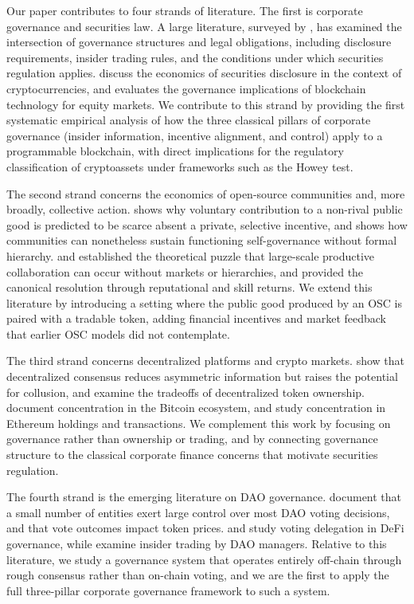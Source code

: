 \documentclass[No]{AEA}
\begin{document}
Our paper contributes to four strands of literature. The first is corporate governance and securities law. A large literature, surveyed by \cite{Mahoney2009}, has examined the intersection of governance structures and legal obligations, including disclosure requirements, insider trading rules, and the conditions under which securities regulation applies. \cite{Choi_Pritchard2019} discuss the economics of securities disclosure in the context of cryptocurrencies, and \cite{yermack2017corporate} evaluates the governance implications of blockchain technology for equity markets. We contribute to this strand by providing the first systematic empirical analysis of how the three classical pillars of corporate governance (insider information, incentive alignment, and control) apply to a programmable blockchain, with direct implications for the regulatory classification of cryptoassets under frameworks such as the Howey test.

The second strand concerns the economics of open-source communities and, more broadly, collective action. \cite{Olson1965} shows why voluntary contribution to a non-rival public good is predicted to be scarce absent a private, selective incentive, and \cite{Ostrom1990} shows how communities can nonetheless sustain functioning self-governance without formal hierarchy. \cite{Coase1937} and \cite{Benkler2002} established the theoretical puzzle that large-scale productive collaboration can occur without markets or hierarchies, and \cite{LernerTirole2005} provided the canonical resolution through reputational and skill returns. We extend this literature by introducing a setting where the public good produced by an OSC is paired with a tradable token, adding financial incentives and market feedback that earlier OSC models did not contemplate.

The third strand concerns decentralized platforms and crypto markets. \cite{Cong_Zhiguo2019} show that decentralized consensus reduces asymmetric information but raises the potential for collusion, and \cite{Sockin_Xiong2023} examine the tradeoffs of decentralized token ownership. \cite{MakarovSchoar22} document concentration in the Bitcoin ecosystem, and \cite{cong2022inclusion} study concentration in Ethereum holdings and transactions. We complement this work by focusing on governance rather than ownership or trading, and by connecting governance structure to the classical corporate finance concerns that motivate securities regulation.

The fourth strand is the emerging literature on DAO governance. \citet{AppelGrennan2023,Appel-Grennan2024} document that a small number of entities exert large control over most DAO voting decisions, and that vote outcomes impact token prices. \cite{Fan-et-al2025} and \cite{Bongaerts-et-al2025} study voting delegation in DeFi governance, while \cite{Cong-et-al2025} examine insider trading by DAO managers. Relative to this literature, we study a governance system that operates entirely off-chain through rough consensus rather than on-chain voting, and we are the first to apply the full three-pillar corporate governance framework to such a system.
\end{document}
